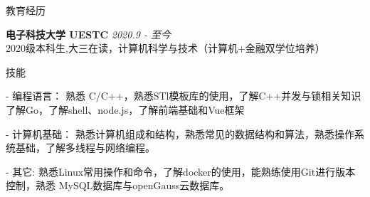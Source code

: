 \documentclass{resume} %
\begin{document}

\begin{rSection}{教育经历}

{\textbf{电子科技大学 UESTC}} \hfill {\em 2020.9 - 至今} \\
2020级本科生,大三在读，计算机科学与技术（计算机+金融双学位培养）

\end{rSection}



\begin{rSection}{技能}
\begin{rSubsection}
{}{}{}{}
\item[-] 编程语言： 熟悉 C/C++，熟悉STl模板库的使用，了解C++并发与锁相关知识\\
 了解Go，了解shell、node.js，了解前端基础和Vue框架
\item[-] 计算机基础： 熟悉计算机组成和结构，熟悉常见的数据结构和算法，熟悉操作系统基础，了解多线程与网络编程。
\item[-] 其它: 熟悉Linux常用操作和命令，了解docker的使用，能熟练使用Git进行版本控制，熟悉 MySQL数据库与openGauss云数据库。
\end{rSubsection}
\end{rSection}


\end{document}
